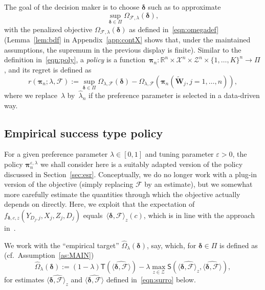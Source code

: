 \documentclass[11pt, a4paper]{article}
\newcommand{\R}{\mathbb{R}}
\theoremstyle{definition}
\begin{document}
The goal of the decision maker is to choose $\bm{\delta}$ such as to approximate~$$\sup_{\bm{\delta} \in \Pi} \Omega_{\mathcal{F}, \lambda}(\bm{\delta}),$$ with the penalized objective $\Omega_{\mathcal{F}, \lambda}(\bm{\delta})$ as defined in~\eqref{eqn:omegadef} (Lemma~\ref{lem:bdf} in Appendix~\ref{app:contX} shows that, under the maintained assumptions, the supremum in the previous display is finite). Similar to the definition in~\eqref{eqn:poly}, a \emph{policy} is a function~$\bm{\pi}_n: \R^n \times \mathcal{X}^n \times \mathcal{Z}^n \times \{1, \hdots, K\}^n \to \Pi$, and its regret is defined as 
%
\begin{equation}\label{eqn:regret2}
r(\bm{\pi}_n; \lambda, \mathcal{F}) := \sup_{\bm{\delta} \in \Pi} \Omega_{\lambda, \mathcal{F}}(\bm{\delta}) - \Omega_{\lambda, \mathcal{F}} \left(\bm{\pi}_n(\tilde{\bm{W}}_j, j = 1, \hdots, n)\right),
\end{equation}
%
where we replace~$\lambda$ by~$\hat{\lambda}_n$ if the preference parameter is selected in a data-driven way.

\subsection{Empirical success type policy}\label{sec:contXes}

For a given preference parameter $\lambda \in [0, 1]$ and tuning parameter $\varepsilon > 0$, the policy $\bm{\pi}^{\varepsilon, \lambda}_n$ we shall consider here is a suitably adapted version of the policy discussed in Section~\ref{sec:esr}. Conceptually, we do no longer work with a plug-in version of the objective (simply replacing $\mathcal{F}$ by an estimate), but we somewhat more carefully estimate the quantities through which the objective actually depends on directly. Here, we exploit that the expectation of~$f_{\bm{\delta}, c, z}(Y_{D_j, j}, X_j, Z_j, D_j)$ equals~$\langle \bm{\delta}, \mathcal{F} \rangle_z(c)$, which is in line with the approach in~\cite{kitagawa2019equality}. 

We work with the ``empirical target'' $\hat{\Omega}_{\lambda}(\bm{\delta})$, say, which, for $\bm{\delta} \in \Pi$ is defined as (cf.~Assumption~\ref{as:MAIN}) $$\hat{\Omega}_{\lambda}(\bm{\delta}) := (1-\lambda) \mathsf{T}(\widehat{\langle \bm{\delta}, \mathcal{F} \rangle} ) - \lambda \max_{z \in \mathcal{Z}} \mathsf{S}(\widehat{\langle \bm{\delta}, \mathcal{F} \rangle_z}, \widehat{\langle \bm{\delta}, \mathcal{F} \rangle}),$$ for estimates $\widehat{\langle \bm{\delta}, \mathcal{F} \rangle_z}$ and $\widehat{\langle \bm{\delta}, \mathcal{F} \rangle}$ defined in~\eqref{eqn:surro} below. 
\end{document}
